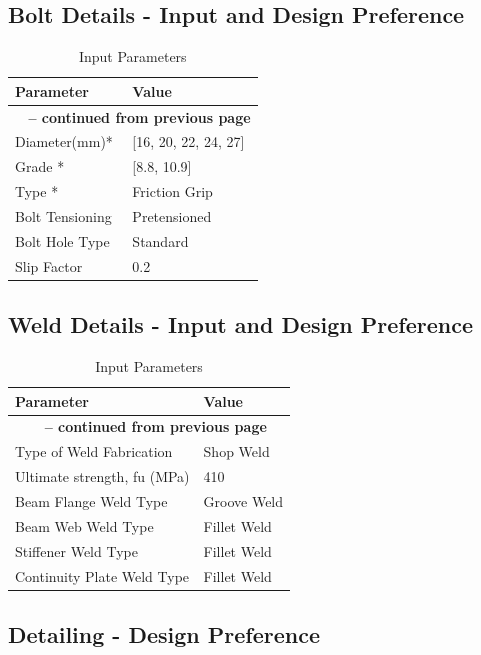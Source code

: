 \documentclass[12pt]{article}
\begin{document}
\subsection{Bolt Details - Input and Design Preference}

\begin{longtable}{ll}
\caption{Input Parameters}
\label{tab:input}
Parameter & Value \\ \hline
\endfirsthead
\multicolumn{2}{c}{{\bfseries \tablename\ \thetable{} -- continued from previous page}} \\
\endhead
\endfoot
\endlastfoot
Diameter(mm)* & [16, 20, 22, 24, 27] \\
\hline
Grade * & [8.8, 10.9] \\
\hline
Type * & Friction Grip \\
\hline
Bolt Tensioning & Pretensioned \\
\hline
Bolt Hole Type & Standard \\
\hline
Slip Factor & 0.2 \\
\hline
\end{longtable}

\subsection{Weld Details - Input and Design Preference}

\begin{longtable}{ll}
\caption{Input Parameters}
\label{tab:input}
Parameter & Value \\ \hline
\endfirsthead
\multicolumn{2}{c}{{\bfseries \tablename\ \thetable{} -- continued from previous page}} \\
\endhead
\endfoot
\endlastfoot
Type of Weld Fabrication & Shop Weld \\
\hline
Ultimate strength, fu (MPa)  & 410 \\
\hline
Beam Flange Weld Type & Groove Weld \\
\hline
Beam Web Weld Type & Fillet Weld \\
\hline
Stiffener Weld Type & Fillet Weld \\
\hline
Continuity Plate Weld Type & Fillet Weld \\
\hline
\end{longtable}

\subsection{Detailing - Design Preference}
\end{document}
